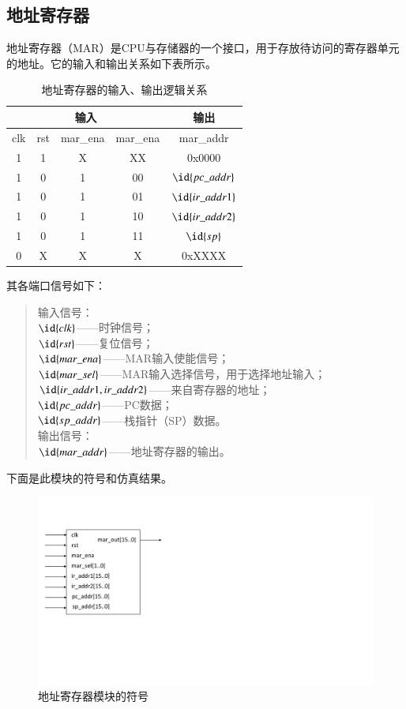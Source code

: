 \documentclass[titlepage, 11pt]{article}
\begin{document}
	\subsection{地址寄存器}
	地址寄存器（MAR）是CPU与存储器的一个接口，用于存放待访问的寄存器单元的地址。它的输入和输出关系如下表所示。
		\begin{table}[htb]
		\centering
		\caption{地址寄存器的输入、输出逻辑关系}
		\begin{tabular}{c|c|c|c|c}
			\multicolumn{4}{c|}{输入}         & 输出              \\ \hline
			clk & rst & mar\_ena & mar\_ena & mar\_addr       \\ \hline
			1   & 1   & X        & XX       & 0x0000          \\ \hline
			1   & 0   & 1        & 00       & $\id{pc\_addr}$  \\ \hline
			1   & 0   & 1        & 01       & $\id{ir\_addr1}$ \\ \hline
			1   & 0   & 1        & 10       & $\id{ir\_addr2}$ \\ \hline
			1   & 0   & 1        & 11       & $\id{sp}$       \\ \hline
			0   & X   & X        & X        & 0xXXXX         
		\end{tabular}
	\end{table}\par 
		其各端口信号如下：
		\begin{quote}
		输入信号：\\
		$\id{clk}$——时钟信号；\\
		$\id{rst}$——复位信号；\\
		$\id{mar\_ena}$——MAR输入使能信号；\\
		$\id{mar\_sel}$——MAR输入选择信号，用于选择地址输入；\\
		$\id{ir\_addr1,ir\_addr2}$——来自寄存器的地址；\\
		$\id{pc\_addr}$——PC数据；\\
		$\id{sp\_addr}$——栈指针（SP）数据。\\
		输出信号：\\
		$\id{mar\_addr}$——地址寄存器的输出。
		\end{quote}
		下面是此模块的符号和仿真结果。
		\begin{figure}[H]
			\includegraphics[scale=0.5]{21.pdf}
			\caption{地址寄存器模块的符号}
		\end{figure}
\end{document}
